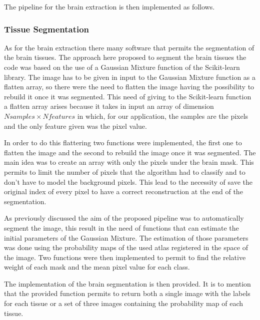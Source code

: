 \documentclass{standalone}
\begin{document}



The pipeline for the brain extraction is then implemented as follows.




\subsubsection{Tissue Segmentation}

As for the brain extraction there many software that permits the segmentation of the brain tissues. 
The approach here proposed to segment the brain tissues the code was based on the use of a Gaussian Mixture function of the Scikit-learn library. 
The image has to be given in input to the Gaussian Mixture function as a flatten array, so there were the need to flatten the image having the possibility to rebuild it once it was segmented.
This need of giving to the Scikit-learn function a flatten array arises because it takes in input an array of dimension $Nsamples \times Nfeatures$ in which, for our application, the samples are the pixels and the only feature given was the pixel value.

In order to do this flattering two functions were implemented, the first one to flatten the image and the second to rebuild the image once it was segmented.
The main idea was to create an array with only the pixels under the brain mask.
This permits to limit the number of pixels that the algorithm had to classify and to don't have to model the background pixels.
This lead to the necessity of save the original index of every pixel to have a correct reconstruction at the end of the segmentation.



As previously discussed the aim of the proposed pipeline was to automatically segment the image, this result in the need of functions that can estimate the initial parameters of the Gaussian Mixture. 
The estimation of those parameters was done using the probability maps of the used atlas registered in the space of the image.
Two functions were then implemented to permit to find the relative weight of each mask and the mean pixel value for each class.



The implementation of the brain segmentation is then provided. It is to mention that the provided function permits to return both a single image with the labels for each tissue or a set of three images containing the probability map of each tissue.
\end{document}
